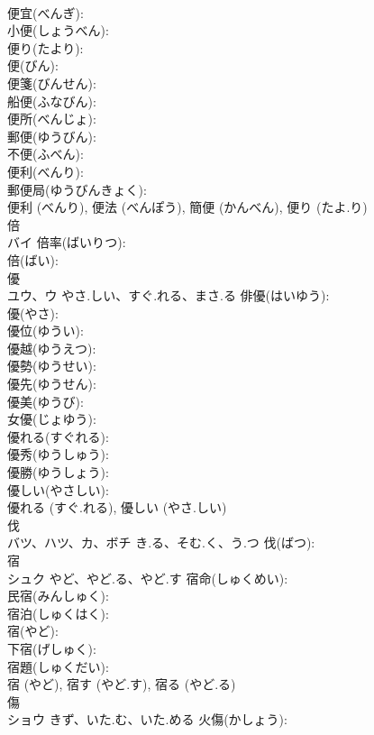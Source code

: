 \documentclass[8pt]{extreport}
\begin{document}
\begin{CJK}{UTF8}{min}
\\	便宜(べんぎ): 
\\	小便(しょうべん): 
\\	便り(たより): 
\\	便(びん): 
\\	便箋(びんせん): 
\\	船便(ふなびん): 
\\	便所(べんじょ): 
\\	郵便(ゆうびん): 
\\	不便(ふべん): 
\\	便利(べんり): 
\\	郵便局(ゆうびんきょく): 
\\	便利 (べんり), 便法 (べんぽう), 簡便 (かんべん), 便り (たよ.り)
\\	倍			
\\	バイ		倍率(ばいりつ): 
\\	倍(ばい): 
\\	優			
\\	ユウ、ウ	やさ.しい、すぐ.れる、まさ.る	俳優(はいゆう): 
\\	優(やさ): 
\\	優位(ゆうい): 
\\	優越(ゆうえつ): 
\\	優勢(ゆうせい): 
\\	優先(ゆうせん): 
\\	優美(ゆうび): 
\\	女優(じょゆう): 
\\	優れる(すぐれる): 
\\	優秀(ゆうしゅう): 
\\	優勝(ゆうしょう): 
\\	優しい(やさしい): 
\\	優れる (すぐ.れる), 優しい (やさ.しい)
\\	伐			
\\	バツ、ハツ、カ、ボチ	き.る、そむ.く、う.つ	伐(ばつ): 
\\	宿			
\\	シュク	やど、やど.る、やど.す	宿命(しゅくめい): 
\\	民宿(みんしゅく): 
\\	宿泊(しゅくはく): 
\\	宿(やど): 
\\	下宿(げしゅく): 
\\	宿題(しゅくだい): 
\\	宿 (やど), 宿す (やど.す), 宿る (やど.る)
\\	傷			
\\	ショウ	きず、いた.む、いた.める	火傷(かしょう): 

\end{CJK}
\end{document}
